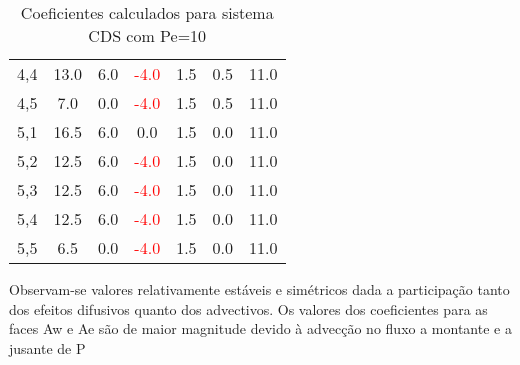 \documentclass[]{article}
\begin{document}
\begin{table}[H]
\begin{tabular}{|c|c|c|c|c|c|c|}
		4,4  & 13.0 & 6.0  & \textcolor{red}{-4.0} & 1.5  & 0.5  & 11.0 \\
		4,5  & 7.0  & 0.0  & \textcolor{red}{-4.0} & 1.5  & 0.5  & 11.0 \\
		5,1  & 16.5 & 6.0  & 0.0  & 1.5  & 0.0  & 11.0 \\
		5,2  & 12.5 & 6.0  & \textcolor{red}{-4.0} & 1.5  & 0.0  & 11.0 \\
		5,3  & 12.5 & 6.0  & \textcolor{red}{-4.0} & 1.5  & 0.0  & 11.0 \\
		5,4  & 12.5 & 6.0  & \textcolor{red}{-4.0} & 1.5  & 0.0  & 11.0 \\
		5,5  & 6.5  & 0.0  & \textcolor{red}{-4.0} & 1.5  & 0.0  & 11.0 \\
		\hline
	\end{tabular}
	\caption{Coeficientes calculados para sistema CDS com Pe=10}
\end{table}

Observam-se valores relativamente estáveis e simétricos dada a participação tanto dos efeitos difusivos quanto dos advectivos. Os valores dos coeficientes para as faces Aw e Ae são de maior magnitude devido à advecção no fluxo a montante e a jusante de P\\
\end{document}
